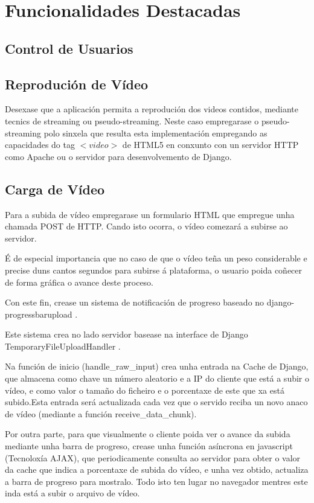 \chapter{Funcionalidades Destacadas}


\section{Control de Usuarios}

\section{Reprodución de Vídeo}
	Desexase que a aplicación permita a reprodución dos videos contidos, mediante tecnics de
	streaming ou pseudo-streaming. Neste caso empregarase o pseudo-streaming polo sinxela que
	resulta esta implementación empregando as capacidades do tag $<video>$ de HTML5 en conxunto
	con un servidor HTTP como Apache ou o servidor para desenvolvemento de Django.

\section{Carga de Vídeo}
	Para a subida de vídeo empregarase un formulario HTML que empregue unha chamada POST de HTTP.
	Cando isto ocorra, o vídeo comezará a subirse ao servidor.
	
	É de especial importancia que no caso de que o vídeo teña un peso considerable e precise 
	duns cantos segundos para subirse á plataforma, o usuario poida coñecer de forma gráfica
	o avance deste proceso.
	
	Con este fin, crease un sistema de notificación de progreso baseado no 
	django-progressbarupload \cite{django-progressbarupload}.

	Este sistema crea no lado servidor basease na interface de Django TemporaryFileUploadHandler
	\cite{TemporaryFileUploadHandler}.
	
	Na función de inicio (handle\_raw\_input) crea unha entrada na Cache de Django, que almacena como 
	chave un número aleatorio e a IP do cliente que está a subir o vídeo, e como valor o tamaño
	do ficheiro e o porcentaxe de este que xa está subido.Esta entrada será actualizada cada vez 
	que o servido reciba un novo anaco de vídeo (mediante a función receive\_data\_chunk). 
	
	Por outra parte, para que visualmente o cliente poida ver o avance da subida mediante unha
	barra de progreso, crease unha función asíncrona en javascript (Tecnoloxía AJAX), que 
	periodicamente consulta ao servidor para obter o valor da cache que indica a porcentaxe de
	subida do vídeo, e unha vez obtido, actualiza a barra de progreso para mostralo. Todo isto
	ten lugar no navegador mentres este inda está a subir o arquivo de vídeo.

